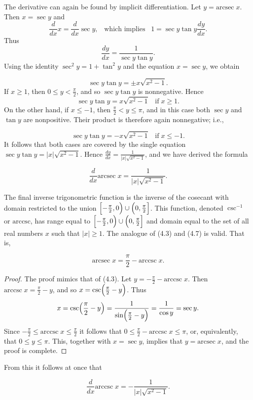 
The derivative can again be found by implicit differentiation. Let $y = \mathrm{arcsec}\; x$.  Then $x = \sec y$ and
$$
\frac{d}{dx} x = \frac{d}{dx} \sec y, \;\;\;\mbox{which implies}\;\;\; 1 = \sec y \tan y \frac{dy}{dx}.
$$
Thus 
$$
\frac{dy}{dx} = \frac{ 1} {\sec y \tan y}.
$$
\noindent Using the identity $\sec^{2} y = 1 + \tan^{2} y$ and the equation $x = \sec y$, we obtain 

$$
\sec y \tan y = \pm x \sqrt{x^{2} - 1}.
$$
If $x \geq 1$, then $0 \leq y < \frac{\pi}{2}$, and so $\sec y \tan y$ is nonnegative. Hence
$$
\sec y \tan y = x \sqrt{x^{2} - 1} \;\;\;\mbox{if}\; x \geq 1.
$$
On the other hand, if $x \leq -1$, then $\frac{\pi}{2} < y \leq \pi$, and in this case both $\sec y$ and $\tan y$ are nonpositive. Their product is therefore again nonnegative; i.e., 

$$
\sec y \tan y = -x \sqrt{x^{2} - 1}\;\;\;  \mbox{if}\; x \leq -1.
$$
It follows that both cases are covered by the single equation $\sec y \tan y = |x| \sqrt{x^{2} -1}$. Hence $\frac{dy}{dx} = \frac{1}{|x| \sqrt{x^2 - 1}}$, and we have derived the formula

\begin{theorem} %
$$
\frac{d}{dx} \mathrm{arcsec}\; x = \frac{1}{|x| \sqrt{x^{2} - 1}}.
$$
\end{theorem}

The final inverse trigonometric function is the inverse of the cosecant with domain restricted to the union $\Bigl[ -\frac{\pi}{2}, 0\Bigr) \cup \Bigl(0, \frac{\pi}{2}\Bigr]$.  This function, denoted $\csc^{-1}$ or $\mathrm{arccsc}$, has range equal to $\Bigl[ - \frac{\pi}{2}, 0\Bigr) \cup \Bigl(0, \frac{\pi}{2}\Bigr]$ and domain equal to the set of all real numbers $x$ such that $|x| \geq 1$. The analogue of (4.3) and (4.7) is valid. That is,

\begin{theorem} %
$$
 \mathrm{arcsec}\; x = \frac{\pi}{2} -  \mathrm{arccsc}\; x.
$$
\end{theorem}


\begin{proof}
The proof mimics that of (4.3). Let $y = -\frac{\pi}{2} - \mathrm{arccsc}\; x$. 
Then $\mathrm{arccsc}\; x = \frac{\pi}{2} - y$, and so $x = \csc \Bigl(\frac{\pi}{2} - y \Bigr)$. Thus
$$
x = \csc \Bigl(\frac{\pi}{2} - y \Bigr) = \frac{1}{\sin \Bigl(\frac{\pi}{2} - y \Bigr)} = \frac{1}{\cos y} = \sec y.
$$
Since $-\frac{\pi}{2} \leq \mathrm{arccsc}\; x \leq \frac{\pi}{2}$ it follows that $0 \leq \frac{\pi}{2} - \mathrm{arccsc}\; x \leq \pi$, or, equivalently, that $0 \leq y \leq \pi$. This, together with $x = \sec y$, implies that $y = \mathrm{arcsec}\; x$, and the proof is complete.
\end{proof}

From this it follows at once that

\begin{theorem} %
$$
\frac{d}{dx} \mathrm{arccsc}\; x 
= -\frac{1}{|x| \sqrt{x^{2} - 1}} .
$$
\end{theorem}

